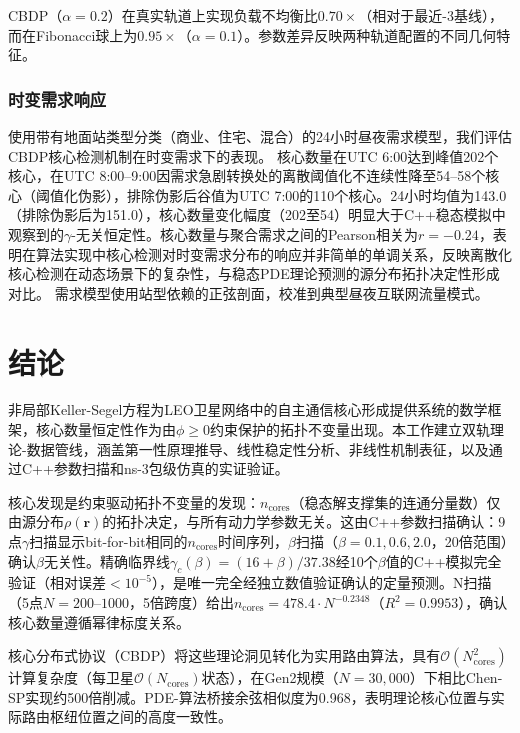 \documentclass[sn-nature,pdflatex]{sn-jnl}
\begin{document}
CBDP（$\alpha=0.2$）在真实轨道上实现负载不均衡比$0.70\times$（相对于最近-3基线），而在Fibonacci球上为$0.95\times$（$\alpha=0.1$）。参数差异反映两种轨道配置的不同几何特征。

\subsubsection{时变需求响应}

使用带有地面站类型分类（商业、住宅、混合）的24小时昼夜需求模型，我们评估CBDP核心检测机制在时变需求下的表现。
核心数量在UTC 6:00达到峰值202个核心，在UTC 8:00--9:00因需求急剧转换处的离散阈值化不连续性降至54--58个核心（阈值化伪影），排除伪影后谷值为UTC 7:00的110个核心。24小时均值为143.0（排除伪影后为151.0），核心数量变化幅度（202至54）明显大于C++稳态模拟中观察到的$\gamma$-无关恒定性。核心数量与聚合需求之间的Pearson相关为$r = -0.24$，表明在算法实现中核心检测对时变需求分布的响应并非简单的单调关系，反映离散化核心检测在动态场景下的复杂性，与稳态PDE理论预测的源分布拓扑决定性形成对比。
需求模型使用站型依赖的正弦剖面，校准到典型昼夜互联网流量模式。

\section{结论}
\label{sec:conclusion}

非局部Keller-Segel方程为LEO卫星网络中的自主通信核心形成提供系统的数学框架，核心数量恒定性作为由$\phi \geq 0$约束保护的拓扑不变量出现。本工作建立双轨理论-数据管线，涵盖第一性原理推导、线性稳定性分析、非线性机制表征，以及通过C++参数扫描和ns-3包级仿真的实证验证。

核心发现是约束驱动拓扑不变量的发现：$n_{\text{cores}}$（稳态解支撑集的连通分量数）仅由源分布$\rho(\mathbf{r})$的拓扑决定，与所有动力学参数无关。这由C++参数扫描确认：9点$\gamma$扫描显示bit-for-bit相同的$n_{\text{cores}}$时间序列，$\beta$扫描（$\beta=0.1, 0.6, 2.0$，20倍范围）确认$\beta$无关性。精确临界线$\gamma_c(\beta) = (16+\beta)/37.38$经10个$\beta$值的C++模拟完全验证（相对误差$<10^{-5}$），是唯一完全经独立数值验证确认的定量预测。N扫描（5点$N=200$--$1000$，5倍跨度）给出$n_{\text{cores}} = 478.4 \cdot N^{-0.2348}$（$R^2=0.9953$），确认核心数量遵循幂律标度关系。

核心分布式协议（CBDP）将这些理论洞见转化为实用路由算法，具有$\mathcal{O}(N_{\text{cores}}^2)$计算复杂度（每卫星$\mathcal{O}(N_{\text{cores}})$状态），在Gen2规模（$N=30,000$）下相比Chen-SP实现约500倍削减。PDE-算法桥接余弦相似度为0.968，表明理论核心位置与实际路由枢纽位置之间的高度一致性。
\end{document}
